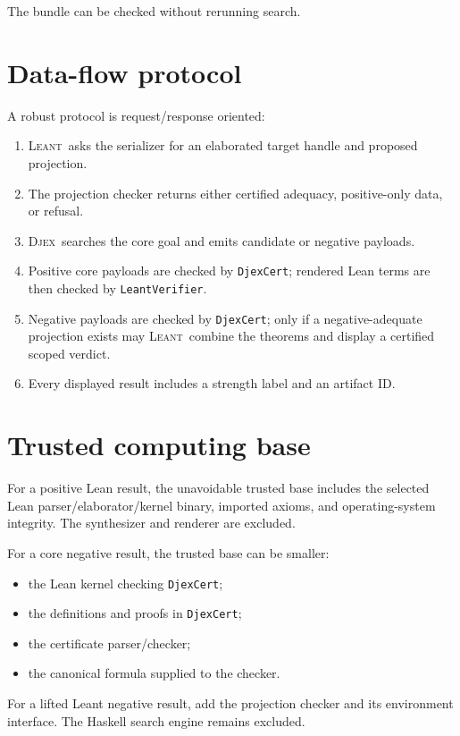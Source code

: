 \documentclass[11pt,letterpaper,openany]{report}
\theoremstyle{definition}
\theoremstyle{remark}
\newcommand{\Djex}{\textsc{Djex}}
\newcommand{\Leant}{\textsc{Leant}}
\newcommand{\code}[1]{\texttt{#1}}
\begin{document}
The bundle can be checked without rerunning search.

\section{Data-flow protocol}

A robust protocol is request/response oriented:

\begin{enumerate}
\item \Leant\ asks the serializer for an elaborated target handle and proposed projection.
\item The projection checker returns either certified adequacy, positive-only data, or refusal.
\item \Djex\ searches the core goal and emits candidate or negative payloads.
\item Positive core payloads are checked by \code{DjexCert}; rendered Lean terms are then checked by \code{LeantVerifier}.
\item Negative payloads are checked by \code{DjexCert}; only if a negative-adequate projection exists may \Leant\ combine the theorems and display a certified scoped verdict.
\item Every displayed result includes a strength label and an artifact ID.
\end{enumerate}

\section{Trusted computing base}

For a positive Lean result, the unavoidable trusted base includes the selected Lean parser/elaborator/kernel binary, imported axioms, and operating-system integrity. The synthesizer and renderer are excluded.

For a core negative result, the trusted base can be smaller:

\begin{itemize}
\item the Lean kernel checking \code{DjexCert};
\item the definitions and proofs in \code{DjexCert};
\item the certificate parser/checker;
\item the canonical formula supplied to the checker.
\end{itemize}

For a lifted Leant negative result, add the projection checker and its environment interface. The Haskell search engine remains excluded.
\end{document}
